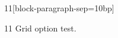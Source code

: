 \documentclass[paper=A4]{ropas-poster}
\begin{document}
\begin{postergrid}{1}{1}[block-paragraph-sep=10bp]
\begin{posterblock}{1}{1}
Grid option test.
\end{posterblock}
\end{postergrid}
\end{document}
